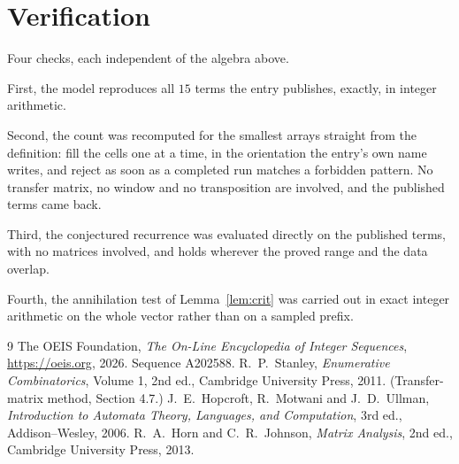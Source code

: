 \documentclass[11pt,a4paper]{article}
\theoremstyle{plain}
\theoremstyle{definition}
\begin{document}
\section{Verification}

Four checks, each independent of the algebra above.

First, the model reproduces all $15$ terms the entry publishes, exactly, in integer
arithmetic.

Second, the count was recomputed for the smallest arrays straight from the definition: fill the
cells one at a time, in the orientation the entry's own name writes, and reject as soon as a
completed run matches a forbidden pattern. No transfer matrix, no window and no transposition
are involved, and the published terms came back.

Third, the conjectured recurrence was evaluated directly on the published terms, with no
matrices involved, and holds wherever the proved range and the data overlap.

Fourth, the annihilation test of Lemma~\ref{lem:crit} was carried out in exact integer
arithmetic on the whole vector rather than on a sampled prefix.

\begin{thebibliography}{9}
 The OEIS Foundation, \emph{The On-Line Encyclopedia of Integer
Sequences}, \url{https://oeis.org}, 2026. Sequence A202588.
 R.~P.~Stanley, \emph{Enumerative Combinatorics}, Volume 1, 2nd ed.,
Cambridge University Press, 2011. (Transfer-matrix method, Section 4.7.)
 J.~E.~Hopcroft, R.~Motwani and J.~D.~Ullman, \emph{Introduction to Automata
Theory, Languages, and Computation}, 3rd ed., Addison--Wesley, 2006.
 R.~A.~Horn and C.~R.~Johnson, \emph{Matrix Analysis}, 2nd ed., Cambridge
University Press, 2013.
\end{thebibliography}
\end{document}
